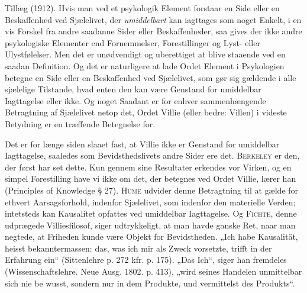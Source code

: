 \documentclass[12pt,a4paper,openany]{book}
\newcommand{\opage}[1]{\marginnote{\footnotesize\textit{[#1]}}}
\newcommand{\whiteline}{\par\vspace{\baselineskip}\par}
\begin{document}
\whiteline

Tillæg (1912). Hvis man ved et psykologik Element forstaar
en Side eller en Beskaffenhed ved Sjælelivet, der \textit{umiddelbart}
kan iagttages som noget Enkelt, i en vis Forskel fra andre saadanne
Sider eller Beskaffenheder, saa gives der ikke andre
psykologiske Elementer end Fornemmelser, Forestillinger og
Lyst- eller Ulystfølelser. Men det er unødvendigt og uberettiget
at blive staaende ved en saadan Definition. Og det er naturligere
at lade Ordet Element i Psykologien betegne en Side
eller en Beskaffenhed ved Sjælelivet, som gør sig gældende i
alle sjælelige Tilstande, hvad enten den kan være Genstand
for umiddelbar Iagttagelse eller ikke. Og noget Saadant er for
enhver sammenhængende Betragtning af Sjælelivet netop det,
Ordet Villie (eller bedre: Villen) i videste Betydning er en
træffende Betegnelse for.

Det er for længe siden slaaet fast, at Villie ikke er Genstand
for umiddelbar Iagttagelse, saaledes som Bevidsthedslivets
andre Sider ere det. \textsc{Berkeley} er den, der først har set dette.
Kun gennem sine Resultater erkendes vor Virken, og en simpel
Forestilling have vi ikke om det, der betegnes ved Ordet
Villie, lærer han (Principles of Knowledge § 27). \textsc{Hume} udvider
denne Betragtning til at gælde for ethvert Aarsagsforhold,
indenfor Sjælelivet, som indenfor den materielle Verden;
intetsteds kan Kausalitet opfattes ved umiddelbar Iagttagelse.
Og \textsc{Fichte}, denne udprægede Villiesfilosof, siger udtrykkeligt,
at man havde ganske Ret, naar man negtede, at Friheden
kunde være Objekt for Bevidstheden. „Ich habe Kausalität,
heisst bekanntermassen: das, was ich mir als Zweck vorsetzte,
trifft in der Erfahrung ein“ (Sittenlehre p. 272 kfr. p. 175).
„Das Ich“, siger han fremdeles (Wissenschaftslehre. Neue Ausg.
1802. p. 413), „wird seines Handelen unmittelbar sich nie be%
\setcounter{footnote}{0}%
\opage{47}wusst, sondern nur in dem Produkte, und vermittelst des
Produkts“.
\end{document}
